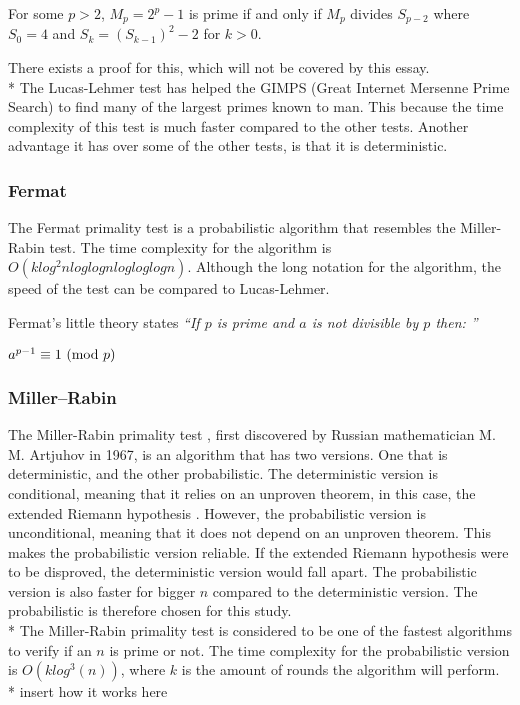 \documentclass[main.tex]{subfiles}
\begin{document}
\begin{mdframed}
  For some $p>2$, $M_p=2^p-1$ is prime if and only if $M_p$ divides $S_{p-2}$
  where $S_0=4$ and $S_k=(S_{k-1})^2-2$ for $k>0$.
\end{mdframed}

There exists a proof for this, which will not be covered by this essay. \newline
\\*
The Lucas-Lehmer test has helped the GIMPS (Great Internet Mersenne Prime
Search) to find many of the largest primes known to man. This because the time
complexity of this test is much faster compared to the other tests. Another
advantage it has over some of the other tests, is that it is deterministic.

\subsubsection{Fermat}
The Fermat primality test \cite{algh:fermat} is a probabilistic algorithm that
resembles the Miller-Rabin test. The time complexity for the algorithm is $O(k
log^{2}n log log n log log log n)$. Although the long notation for the
algorithm, the speed of the test can be compared to Lucas-Lehmer.

Fermat's little theory \cite{fermat:little} states \textit{``If $p$ is prime and
  $a$ is not divisible by $p$ then: ''}

\begin{mdframed}
  \centering
  $a^{p - 1} \equiv 1 \ (\mathrm{mod}\ p)$
\end{mdframed}

\subsubsection{Miller–Rabin}
The Miller-Rabin primality test \cite{algh:miller}, first discovered by Russian
mathematician M. M. Artjuhov in 1967, is an algorithm that has two versions. One
that is deterministic, and the other probabilistic. The deterministic version is
conditional, meaning that it relies on an unproven theorem, in this case, the
extended Riemann hypothesis \cite{riemann}. However, the probabilistic version
is unconditional, meaning that it does not depend on an unproven theorem. This
makes the probabilistic version reliable. If the extended Riemann hypothesis
were to be disproved, the deterministic version would fall apart. The
probabilistic version is also faster for bigger $n$ compared to the
deterministic version. The probabilistic is therefore chosen for this study.
\newline
\\*
The Miller-Rabin primality test is considered to be one of the fastest
algorithms to verify if an $n$ is prime or not. The time complexity for the
probabilistic version is $O(k log^{3}(n))$, where $k$ is the amount of rounds
the algorithm will perform. \newline
\\*
insert how it works here
\end{document}
